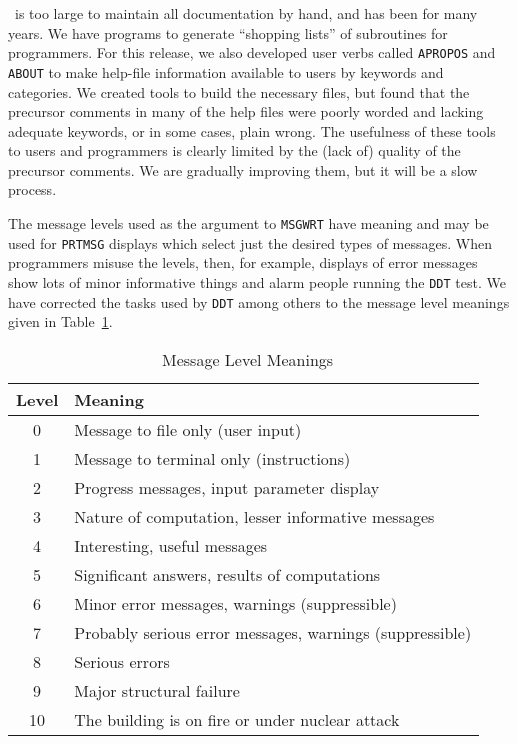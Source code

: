\begin{description}
 \AIPS\ is too large to
         maintain all documentation by hand, and has been for many
         years.  We have programs to generate ``shopping lists'' of
         subroutines for programmers.  For this release, we also
         developed user verbs called {\tt APROPOS} and {\tt ABOUT} to
         make help-file information available to users by keywords and
         categories.  We created tools to build the necessary files,
         but found that the precursor comments in many of the help
         files were poorly worded and lacking adequate keywords, or in
         some cases, plain wrong.  The usefulness of these tools to
         users and programmers is clearly limited by the (lack of)
         quality of the precursor comments.  We are gradually
         improving them, but it will be a slow process.

 The message levels used as
         the argument to {\tt MSGWRT} have meaning and may be used for
         {\tt PRTMSG} displays which select just the desired types of
         messages.  When programmers misuse the levels, then, for
         example, displays of error messages show lots of minor
         informative things and alarm people running the {\tt DDT}
         test.  We have corrected the tasks used by {\tt DDT} among
         others to the message level meanings given in
         Table~\ref{ta:message}.
\begin{table}
\protect\begin{center}
\protect\begin{tabular}{|c|l|} \hline
Level & Meaning \\  \hline
 0 & Message to file only (user input) \\
 1 & Message to terminal only (instructions) \\
 2 & Progress messages, input parameter display \\
 3 & Nature of computation, lesser informative messages \\
 4 & Interesting, useful messages \\
 5 & Significant answers, results of computations \\
 6 & Minor error messages, warnings (suppressible) \\
 7 & Probably serious error messages, warnings (suppressible) \\
 8 & Serious errors \\
 9 & Major structural failure \\
10 & The building is on fire or under nuclear attack \\
\hline
\end{tabular}
\end{center}
\caption{\AIPS\ Message Level Meanings}
\label{ta:message}
\end{table}
\end{description}

